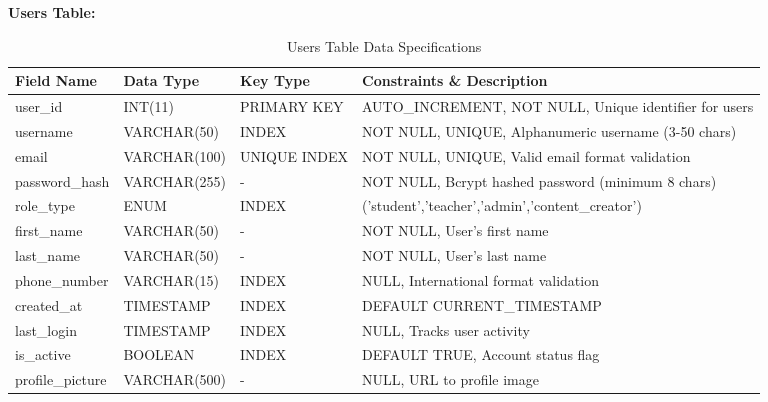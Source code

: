 \documentclass[12pt,a4paper,oneside]{book}
\begin{document}
\textbf{Users Table:}
\begin{table}[H]
\centering
\caption{Users Table Data Specifications}
\footnotesize
\begin{tabular}{|L{3cm}|L{2.5cm}|L{1.5cm}|L{5cm}|}
\hline
\textbf{Field Name} & \textbf{Data Type} & \textbf{Key Type} & \textbf{Constraints \& Description} \\
\hline
user\_id & INT(11) & PRIMARY KEY & AUTO\_INCREMENT, NOT NULL, Unique identifier for users \\
\hline
username & VARCHAR(50) & INDEX & NOT NULL, UNIQUE, Alphanumeric username (3-50 chars) \\
\hline
email & VARCHAR(100) & UNIQUE INDEX & NOT NULL, UNIQUE, Valid email format validation \\
\hline
password\_hash & VARCHAR(255) & - & NOT NULL, Bcrypt hashed password (minimum 8 chars) \\
\hline
role\_type & ENUM & INDEX & ('student','teacher','admin','content\_creator') \\
\hline
first\_name & VARCHAR(50) & - & NOT NULL, User's first name \\
\hline
last\_name & VARCHAR(50) & - & NOT NULL, User's last name \\
\hline
phone\_number & VARCHAR(15) & INDEX & NULL, International format validation \\
\hline
created\_at & TIMESTAMP & INDEX & DEFAULT CURRENT\_TIMESTAMP \\
\hline
last\_login & TIMESTAMP & INDEX & NULL, Tracks user activity \\
\hline
is\_active & BOOLEAN & INDEX & DEFAULT TRUE, Account status flag \\
\hline
profile\_picture & VARCHAR(500) & - & NULL, URL to profile image \\
\hline
\end{tabular}
\end{table}
\end{document}
